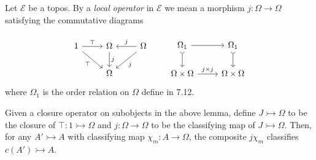 \documentclass[a4paper]{article}
\newcommand{\mono}{\rightarrowtail}
\begin{document}
\begin{definition}
  Let \(\mathcal E\) be a topos. By a \emph{local operator} in \(\mathcal E\) we mean a morphism \(j: \Omega \to \Omega\) satisfying the commutative diagrams
  \[
    \begin{tikzcd}
    \end{tikzcd}
  \]
  \[
    \begin{tikzcd}
      1 \ar[r, "\top"] \ar[dr, "\top"'] & \Omega \ar[d, "j"] & \Omega \ar[l, "j"'] \ar[dl, "j"] \\
      & \Omega
    \end{tikzcd}
    \qquad
    \begin{tikzcd}
      \Omega_1 \ar[r] \ar[d, tail] & \Omega_1 \ar[d, tail] \\
      \Omega \times \Omega \ar[r, "j \times j"] & \Omega \times \Omega
    \end{tikzcd}
  \]
  where \(\Omega_1\) is the order relation on \(\Omega\) define in 7.12.

  Given a closure operator on subobjects in the above lemma, define \(J \mono \Omega\) to be the closure of \(\top: 1 \mono \Omega\) and \(j: \Omega \to \Omega\) to be the classifying map of \(J \mono \Omega\). Then, for any \(A' \mono A\) with classifying map \(\chi_m: A \to \Omega\), the composite \(j \chi_m\) classifies \(c(A') \mono A\).
\end{definition}



\printindex
\end{document}
